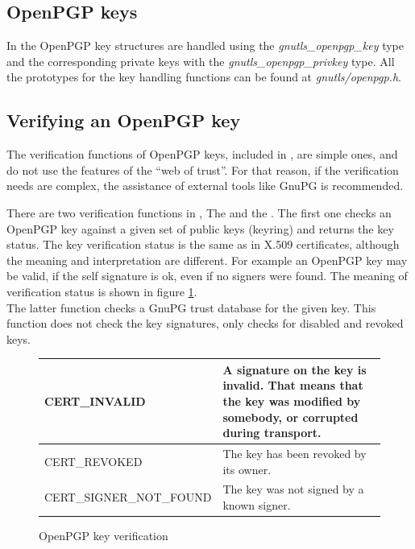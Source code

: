 \subsection*{OpenPGP keys}
In \gnutls{} the OpenPGP key structures are handled using the
\emph{gnutls\_openpgp\_key} type and the corresponding private keys with
the \emph{gnutls\_openpgp\_privkey} type. All the prototypes for the key handling
functions can be found at \emph{gnutls/openpgp.h}.

\subsection*{Verifying an OpenPGP key}
The verification functions of OpenPGP keys, included in \gnutls{}, 
are simple ones, and do not use the features of the ``web of trust''.
For that reason, if the verification needs are complex, 
the assistance of external tools like GnuPG is recommended.
\par
There are two verification functions in \gnutls{},
The 
and the . 
The first one checks an OpenPGP key against a given set of public keys (keyring) and
returns the key status. The key verification status is the same as in X.509 certificates,
although the meaning and interpretation are different. For example an OpenPGP key may
be valid, if the self signature is ok, even if no signers were found.
The meaning of verification status is shown in figure \ref{fig:pgp_verify}.
\\
The latter function checks a GnuPG trust database for the given key. This function does not
check the key signatures, only checks for disabled and revoked keys.

\begin{figure}[hbtp]
\begin{tabular}{|l|p{7cm}|}

\hline
CERT\_INVALID & A signature on the key is invalid. That means that the key was modified
by somebody, or corrupted during transport.
\\
\hline
CERT\_REVOKED & The key has been revoked by its owner.
\\
\hline
CERT\_SIGNER\_NOT\_FOUND & The key was not signed by a known signer.
\\
\hline
\end{tabular}
\caption{OpenPGP key verification}
\label{fig:pgp_verify}
\end{figure}

